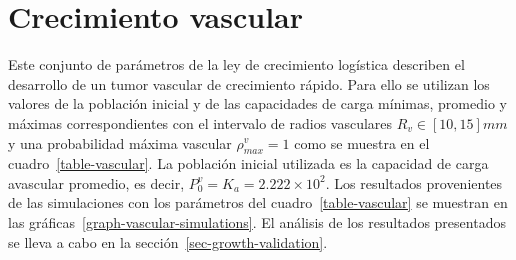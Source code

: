 
\section{Crecimiento vascular}
\label{sec-vascular-results}
Este conjunto de par\'ametros de la ley de crecimiento log\'istica describen el desarrollo de un tumor vascular de crecimiento r\'apido. Para ello se utilizan los valores de la poblaci\'on inicial y de las capacidades de carga m\'inimas, promedio y m\'aximas correspondientes con el intervalo de radios vasculares $R_v \in [10, 15]mm$ y una probabilidad m\'axima vascular $\rho_{max}^v=1$ como se muestra en el cuadro~\ref{table-vascular}. La poblaci\'on inicial utilizada es la capacidad de carga avascular promedio, es decir, $P_0^v = K_a = 2$.$222 \times 10^2$. Los resultados provenientes de las simulaciones con los par\'ametros del cuadro~\ref{table-vascular} se muestran en las gr\'aficas~\ref{graph-vascular-simulations}. El an\'alisis de los resultados presentados se lleva a cabo en la secci\'on~\ref{sec-growth-validation}.
\begin{table}[!ht]
\begin{center}
\vspace*{-0.6cm}
\end{center}
\caption[Par\'ametros del desarrollo de un carcinoma ductal infiltrante de crecimiento r\'apido durante la etapa vascular]{Par\'ametros del desarrollo de un carcinoma ductal infiltrante de crecimiento r\'apido durante la etapa vascular.}
\label{table-vascular}
\end{table}

